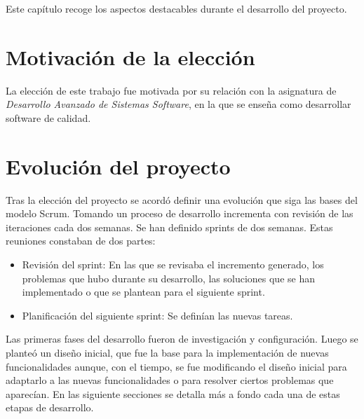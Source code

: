 


Este capítulo recoge los aspectos destacables durante el desarrollo del proyecto.
\section{Motivación de la elección}
La elección de este trabajo fue motivada por su relación con la asignatura de \textit{Desarrollo Avanzado de Sistemas Software}, en la que se enseña como desarrollar software de calidad.
\section{Evolución del proyecto}
Tras la elección del proyecto se acordó definir una evolución que siga las bases del modelo Scrum. Tomando un proceso de desarrollo incrementa con revisión de las iteraciones cada dos semanas.
Se han definido sprints de dos semanas. Estas reuniones constaban de dos partes:
\begin{itemize}
	\item Revisión del sprint: En las que se revisaba el incremento generado, los problemas que hubo durante su desarrollo, las soluciones que se han implementado o que se plantean para el siguiente sprint.
	\item Planificación del siguiente sprint: Se definían las nuevas tareas.
\end{itemize}
Las primeras fases del desarrollo fueron de investigación y configuración. Luego se planteó un diseño inicial, que fue la base para la implementación de nuevas funcionalidades aunque, con el tiempo, se fue modificando el diseño inicial para adaptarlo a las nuevas funcionalidades o para resolver ciertos problemas que aparecían. En las siguiente secciones se detalla más a fondo cada una de estas etapas de desarrollo.
